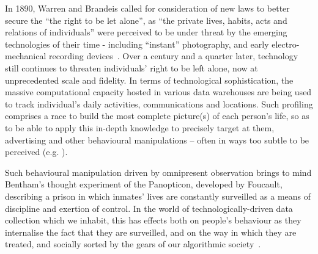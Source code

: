 \documentclass{IOS-Book-Article}     %
\begin{document}
In 1890, Warren and Brandeis called for consideration of new laws to better
secure the ``the right to be let alone'', as ``the private lives, habits, acts
and relations of individuals'' were perceived to be under threat by the emerging
technologies of their time - including ``instant'' photography, and early
electro-mechanical recording devices~\cite{warren1890right}.  Over a century and
a quarter later, technology still continues to threaten individuals' right to be
left alone, now at unprecedented scale and fidelity. In terms of technological
sophistication, the massive computational capacity hosted in various data
warehouses are being used to track individual's daily activities, communications
and locations.  Such profiling comprises a race to build the most complete
picture(s) of each person's life, so as to be able to apply this in-depth
knowledge  to precisely target at them, advertising and other behavioural
manipulations -- often in ways too subtle to be perceived (e.g.
\cite{Kramer17062014}).    


Such behavioural manipulation driven by omnipresent observation brings to mind
Bentham's thought experiment of the Panopticon, developed by Foucault,
describing a prison in which inmates' lives are constantly surveilled as a means
of discipline and exertion of control.  In the world of technologically-driven
data collection which we inhabit, this has effects both on people's behaviour as
they internalise the fact that they are surveilled, and on the way in which they
are treated, and socially sorted by the gears of our algorithmic
society~\cite{simon2005Panopticism}.        
\end{document}
